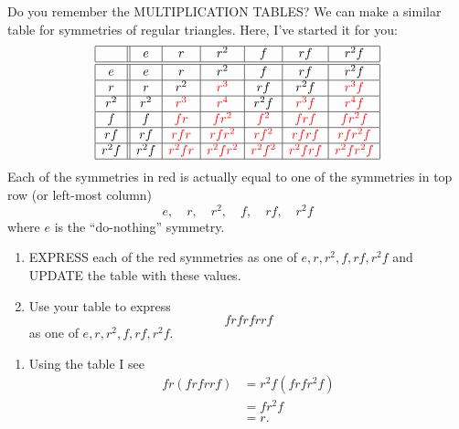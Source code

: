 \documentclass[noauthor,nooutcomes,12pt,hints]{ximera}
\begin{document}
\begin{question}
  Do you remember the MULTIPLICATION TABLES? We can make a similar
  table for symmetries of regular triangles. Here, I've started it for
  you:
  \[
  \begin{array}{|c||c|c|c|c|c|c|}
    \hline
      & e & r & r^2 & f & rf & r^2f\\ \hline\hline
    e & e & r & r^2 & f & rf & r^2f\\ \hline
    r & r & r^2 & \color{red}r^3 & rf & r^2f & \color{red}r^3f\\ \hline
    r^2 & r^2 & \color{red}r^3 & \color{red}r^4 & r^2f & \color{red}r^3f &\color{red} r^4f\\ \hline
    f  & f & \color{red}fr & \color{red}fr^2 & \color{red}f^2 & \color{red}frf & \color{red}fr^2f\\ \hline
    rf & rf & \color{red}rfr & \color{red}rfr^2 & \color{red}rf^2 & \color{red}rfrf & \color{red}rfr^2f\\ \hline
    r^2f & r^2f & \color{red}r^2fr & \color{red}r^2fr^2 & \color{red}r^2f^2 &\color{red} r^2frf &\color{red} r^2fr^2f\\ \hline
  \end{array}
  \]
  Each of the symmetries in red is actually equal to one of the
  symmetries in top row (or left-most column)
  \[
  e,\quad r,\quad r^2,\quad f,\quad rf,\quad r^2f
  \]
  where $e$ is the ``do-nothing'' symmetry.
  \begin{enumerate}
    \item EXPRESS each of the red symmetries as one of
      $e,r,r^2,f,rf,r^2f$ and UPDATE the table with these values.
    \item Use your table to express
      \[
      frfrfrrf
      \]
      as one of $e,r,r^2,f,rf,r^2f$.
  \end{enumerate}
  \begin{freeResponse}
    \begin{enumerate}
      Here is my updated table:
       \[
  \begin{array}{|c||c|c|c|c|c|c|}
    \hline
    & e & r & r^2 & f & rf & r^2f\\ \hline\hline
    e & e & r & r^2 & f & rf & r^2f\\ \hline
    r & r & r^2 & e & rf & r^2f & f\\ \hline
    r^2 & r^2 & e & r & r^2f & f &rf\\ \hline
    f  & f & r^2f & rf & e & r^2 & r\\ \hline
    rf & rf & f & r^2f & r & e & r^2\\ \hline
    r^2f & r^2f & rf & f & r^2 & r & e\\ \hline
  \end{array}
  \]
\item Using the table I see
  \begin{align*}
    fr(frfrrf) &= r^2f(frfr^2f)\\
    &= fr^2f\\
    &=r.
  \end{align*}
    \end{enumerate}
  \end{freeResponse}
\end{question}
\end{document}
